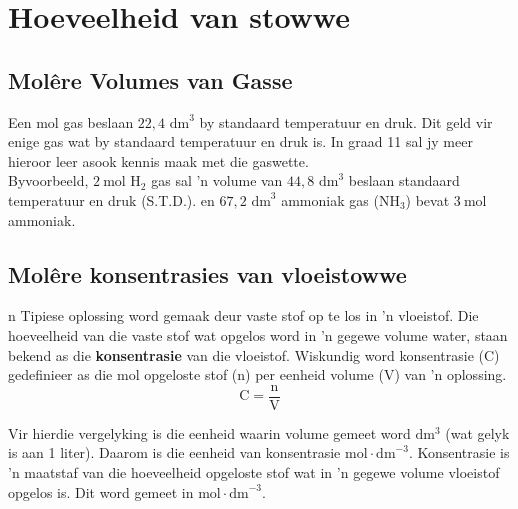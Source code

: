 \section{Hoeveelheid van stowwe}
            \subsection*{Mol\^{e}re Volumes van Gasse}
            \nopagebreak
            \par
            \label{m38712*eip-id1168064596799}
  {Een mol gas beslaan $22,4{\text{ dm}}^{3}$ by standaard temperatuur en druk. } 
Dit geld vir enige gas wat by standaard temperatuur en druk is. In graad 11 sal jy meer hieroor leer asook kennis maak met die gaswette.\\
Byvoorbeeld, $2~\text{mol}$ $\text{H}_2$ gas sal 'n volume van $44,8{\text{ dm}}^{3}$ beslaan standaard temperatuur en druk (S.T.D.). en $67,2{\text{ dm}}^{3}$ ammoniak gas ($\text{NH}_3$) bevat $3~\text{mol}$ ammoniak.
    \label{m38712*cid8}
            \subsection*{Mol\^{e}re konsentrasies van vloeistowwe}
            \nopagebreak
n Tipiese oplossing word gemaak deur vaste stof op te los in 'n vloeistof. Die hoeveelheid van die vaste stof wat opgelos word in  'n gegewe volume water, staan bekend as die \textbf{konsentrasie} van die vloeistof. Wiskundig word konsentrasie (C) gedefinieer as die mol opgeloste stof (n) per eenheid volume (V) van  'n oplossing.\\
      \label{m38712*id282860}\nopagebreak\noindent{}      
    \begin{equation*}
    \text{C}=\frac{\text{n}}{\text{V}}
      \end{equation*}
	\begin{figure}[H] %
\begin{center}
\end{center}
 \end{figure}
Vir hierdie vergelyking is die eenheid waarin volume gemeet word $\text{dm}{}^{3}$ (wat gelyk is aan 1 liter). Daarom is die eenheid van  konsentrasie  $\text{mol} \cdot {\text{dm}}^{-3}$. 
\label{m38712*fhsst!!!underscore!!!id1650}
 {Konsentrasie is 'n maatstaf van die hoeveelheid opgeloste stof wat in 'n gegewe volume vloeistof opgelos is. Dit word gemeet in $\text{mol} \cdot {\text{dm}}^{-3}$.} 
 
